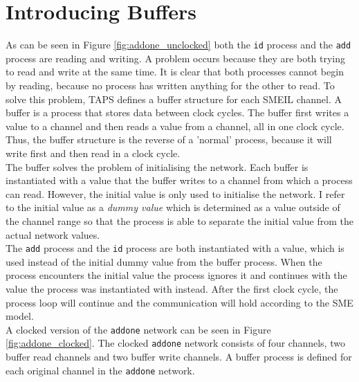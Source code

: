 \section{Introducing Buffers}
As can be seen in Figure \ref{fig:addone_unclocked} both the \texttt{id} process and the \texttt{add} process are reading and writing. A problem occurs because they are both trying to read and write at the same time. It is clear that both processes cannot begin by reading, because no process has written anything for the other to read.
To solve this problem, TAPS defines a buffer structure for each SMEIL channel. A buffer is a process that stores data between clock cycles. The buffer first writes a value to a channel and then reads a value from a channel, all in one clock cycle. Thus, the buffer structure is the reverse of a 'normal' process, because it will write first and then read in a clock cycle. \\

The buffer solves the problem of initialising the network. Each buffer is instantiated with a value that the buffer writes to a channel from which a process can read. However, the initial value is only used to initialise the network. I refer to the initial value as a \textit{dummy value} which is determined as a value outside of the channel range so that the process is able to separate the initial value from the actual network values. \\

The \texttt{add} process and the \texttt{id} process are both instantiated with a value, which is used instead of the initial dummy value from the buffer process. When the process encounters the initial value the process ignores it and continues with the value the process was instantiated with instead. After the first clock cycle, the process loop will continue and the communication will hold according to the SME model.\\

A clocked version of the \texttt{addone} network can be seen in Figure \ref{fig:addone_clocked}. The clocked \texttt{addone} network consists of four channels, two buffer read channels and two buffer write channels. A buffer process is defined for each original channel in the \texttt{addone} network. \\

